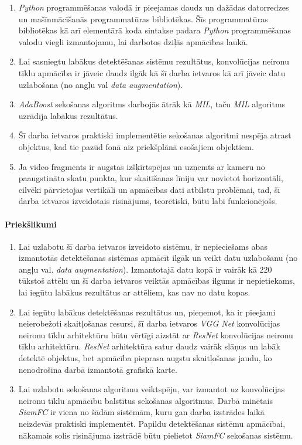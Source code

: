 \begin{enumerate}
	\item \textit{Python} programmēšanas valodā ir pieejamas daudz un dažādas datorredzes un mašīnmācīšanās programmatūras bibliotēkas. Šīs programmatūras bibliotēkas kā arī elementārā koda sintakse padara \textit{Python} programmēšanas valodu viegli izmantojamu, lai darbotos dziļās apmācības laukā.
	\item Lai sasniegtu labākus detektēšanas sistēmu rezultātus, konvolūcijas neironu tīklu apmācība ir jāveic daudz ilgāk kā šī darba ietvaros kā arī jāveic datu uzlabošana (no angļu val \textit{data augmentation}).
	\item \textit{AdaBoost} sekošanas algoritms darbojās ātrāk kā \textit{MIL}, taču \textit{MIL} algoritms uzrādīja labākus rezultātus.
	\item Šī darba ietvaros praktiski implementētie sekošanas algoritmi nespēja atrast objektus, kad tie pazūd fonā aiz priekšplānā esošajiem objektiem.
	\item Ja video fragments ir augstas izšķirtspējas un uzņemts ar kameru no paaugstināta skatu punkta, kur skaitīšanas līniju var novietot horizontāli, cilvēki pārvietojas vertikāli un apmācības dati atbilstu problēmai, tad, šī darba ietvaros izveidotais risinājums, teorētiski, būtu labi funkcionējošs.
\end{enumerate}
\paragraph{Priekšlikumi}
\hfill\par
\begin{enumerate}
	\item Lai uzlabotu šī darba ietvaros izveidoto sistēmu, ir nepieciešams abas izmantotās detektēšanas sistēmas apmācīt ilgāk un veikt datu uzlabošanu (no angļu val. \textit{data augmentation}). Izmantotajā datu kopā ir vairāk kā 220 tūkstoš attēlu un šī darba ietvaros veiktās apmācības ilgums ir nepietiekams, lai iegūtu labākus rezultātus ar attēliem, kas nav no datu kopas.
	\item Lai iegūtu labākus detektēšanas rezultātus un, pieņemot, ka ir pieejami neierobežoti skaitļošanas resursi, šī darba ietvaros \textit{VGG Net} konvolūcijas neironu tīklu arhitektūru būtu vērtīgi aizstāt ar \textit{ResNet} konvolūcijas neironu tīklu arhitektūru. \textit{ResNet} arhitektūra satur daudz vairāk slāņus un labāk detektē objektus, bet apmācība pieprasa augstu skaitļošanas jaudu, ko nenodrošina darbā izmantotā grafiskā karte. 
	\item Lai uzlabotu sekošanas algoritmu veiktspēju, var izmantot uz konvolūcijas neironu tīklu apmācību balstītus sekošanas algoritmus. Darbā minētais \textit{SiamFC} ir viena no šādām sistēmām, kuru gan darba izstrādes laikā neizdevās praktiski implementēt. Papildu detektēšanas sistēmu apmācībai, nākamais solis risinājuma izstrādē būtu pielietot \textit{SiamFC} sekošanas sistēmu. 
\end{enumerate}